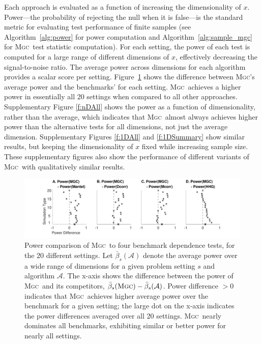 \documentclass[11pt]{article}
\providecommand{\sct}[1]{{\normalfont\textsc{#1}}}
\providecommand{\mc}[1]{\mathcal{#1}}
\newcommand{\Mgc}{\sct{Mgc}}
\newcommand{\Dcorr}{\sct{Dcorr}}
\newcommand{\Mcorr}{\sct{Mcorr}}
\newcommand{\Mantel}{\sct{Mantel}}
\begin{document}
Each approach is evaluated as a function of increasing the dimensionality of $x$.  Power---the probability of rejecting the null when it is  false---is the standard metric for evaluating test performance of finite samples (see Algorithm~\ref{alg:power} for power computation and Algorithm~\ref{alg:sample_mgc} for \Mgc~test statistic computation).  
For each setting, the power of each test is computed for a large range of different dimensions of $x$,  effectively decreasing the signal-to-noise ratio.  
The average power across dimensions for each algorithm provides a scalar score per setting.  %
Figure~\ref{f:nDSummary} shows the difference between \Mgc's average power and the benchmarks' for each setting.  
\Mgc~achieves a higher power in essentially all 20 settings when compared to all other approaches.  
Supplementary Figure \ref{f:nDAll} shows the power as a function of dimensionality, rather than the average, which indicates that  \Mgc~almost always achieves higher power than the alternative tests for all dimensions, not just the average dimension.  
 Supplementary Figures \ref{f:1DAll} and \ref{f:1DSummary} show similar results,  but keeping the dimensionality of $x$ fixed while increasing sample size. These supplementary figures also show the performance of different variants of \Mgc~with qualitatively similar results.%



\begin{figure}
  \centering
  \includegraphics[width=1.0\textwidth,trim={3.5cm 0 3.5cm 0},clip]{Figures/FigHDPowerMGCM}
  \caption{Power comparison of  \Mgc~to four benchmark dependence tests, for the $20$ different settings.  
Let $\bar{\beta}_s(\mathcal{A})$ denote the average power over a wide range of dimensions for a given problem setting $s$ and algorithm $\mc{A}$. The x-axis shows the difference between the power of \Mgc~and its competitors,  $\bar{\beta}_s(\Mgc)-\bar{\beta}_s(\mathcal{A})$. Power difference $>0$ indicates that \Mgc~achieves higher average power over the benchmark for a given setting;
the large dot on the x-axis indicates the  power differences averaged over all 20 settings.
\Mgc~nearly dominates all benchmarks, exhibiting similar or better power for nearly all settings. 
}
\label{f:nDSummary}
\end{figure}
\end{document}
